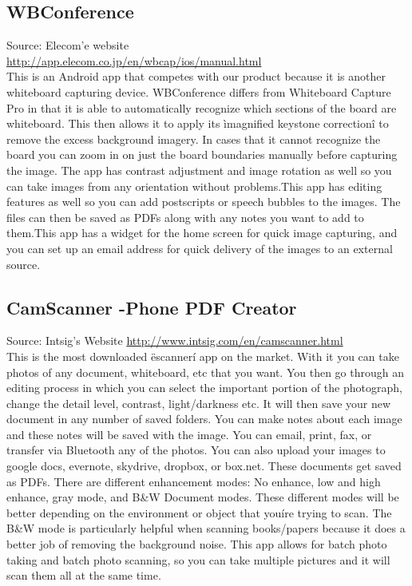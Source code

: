 \documentclass[]{article}
\begin{document}
				\subsection*{WBConference}
Source: Elecom'e website\\
{\color{red} \url{http://app.elecom.co.jp/en/wbcap/ios/manual.html}} \\
					
This is an Android app that competes with our product because it is another whiteboard capturing device. WBConference differs from Whiteboard Capture Pro in that it is able to automatically recognize which sections of the board are whiteboard. This then allows it to apply its ìmagnified keystone correctionî to remove the excess background imagery. In cases that it cannot recognize the board you can zoom in on just the board boundaries manually before capturing the image. The app has contrast adjustment and image rotation as well so you can take images from any orientation without problems.This app has editing features as well so you can add postscripts or speech bubbles to the images. The files can then be saved as PDFs along with any notes you want to add to them.This app has a widget for the home screen for quick image capturing, and you can set up an email address for quick delivery of the images to an external source. \\
				\subsection{CamScanner -Phone PDF Creator}
Source: Intsig's Website
{\color{red} \url{http://www.intsig.com/en/camscanner.html}} \\
					
This is the most downloaded ëscannerí app on the market. With it you can take photos of any document, whiteboard, etc that you want. You then go through an editing process in which you can select the important portion of the photograph, change the detail level, contrast, light/darkness etc. It will then save your new document in any number of saved folders. You can make notes about each image and these notes will be saved with the image. You can email, print, fax, or transfer via Bluetooth any of the photos. You can also upload your images to google docs, evernote, skydrive, dropbox, or box.net. These documents get saved as PDFs. There are different enhancement modes: No enhance, low and high enhance, gray mode, and B\&W Document modes. These different modes will be better depending on the environment or object that youíre trying to scan. The B\&W mode is particularly helpful when scanning books/papers because it does a better job of removing the background noise. This app allows for batch photo taking and batch photo scanning, so you can take multiple pictures and it will scan them all at the same time. \\
\end{document}
